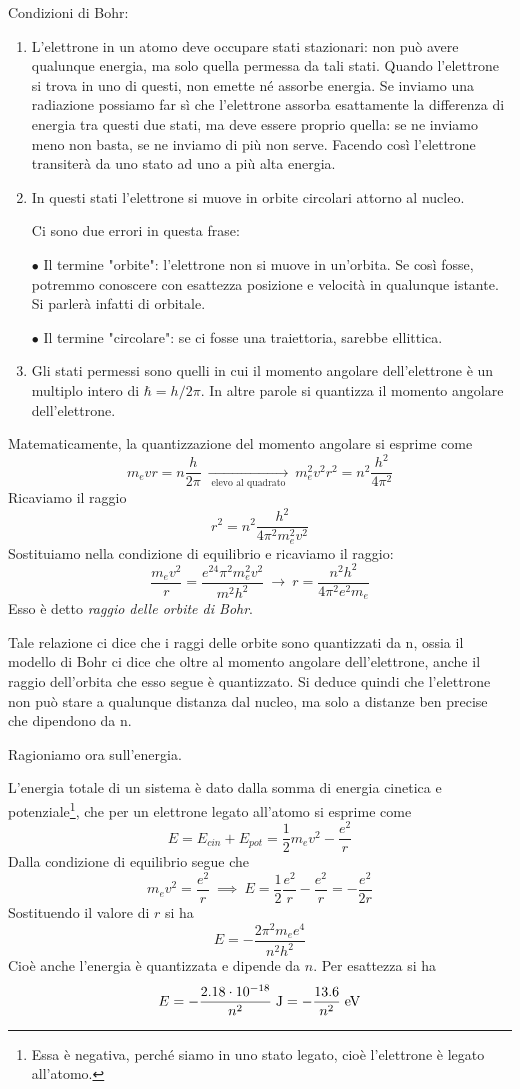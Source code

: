 Condizioni di Bohr:
\begin{enumerate}
  \item L'elettrone in un atomo deve occupare stati stazionari: non può avere qualunque energia, ma solo quella permessa da tali stati. Quando l'elettrone si trova in uno di questi, non emette né assorbe energia. Se inviamo una radiazione possiamo far sì che l'elettrone assorba esattamente la differenza di energia tra questi due stati, ma deve essere proprio quella: se ne inviamo meno non basta, se ne inviamo di più non serve.
  Facendo così l'elettrone transiterà da uno stato ad uno a più alta energia.
  \item In questi stati l'elettrone si muove in orbite circolari attorno al nucleo.
  
  Ci sono due errori in questa frase:

  $\bullet$ Il termine "orbite": l'elettrone non si muove in un'orbita. Se così fosse, potremmo conoscere con esattezza posizione e velocità in qualunque istante. Si parlerà infatti di orbitale.

  $\bullet$ Il termine "circolare": se ci fosse una traiettoria, sarebbe ellittica.
  \item Gli stati permessi sono quelli in cui il momento angolare dell'elettrone è un multiplo intero di $\hbar=h/2\pi$. In altre parole si quantizza il momento angolare dell'elettrone. 
\end{enumerate}
Matematicamente, la quantizzazione del momento angolare si esprime come
$$m_evr=n\frac{h}{2\pi}\ \xrightarrow[\; \text{elevo al quadrato} \;]{} \ m_e^2v^2r^2=n^2\frac{h^2}{4\pi^2}$$
Ricaviamo il raggio
$$r^2=n^2\frac{h^2}{4\pi^2m_e^2v^2}$$
Sostituiamo nella condizione di equilibrio e ricaviamo il raggio:
$$\frac{m_ev^2}{r}=\frac{e^24\pi^2m_e^2v^2}{m^2h^2}\ \rightarrow\ r=\frac{n^2h^2}{4\pi^2e^2m_e}$$
Esso è detto \textit{raggio delle orbite di Bohr}.

Tale relazione ci dice che i raggi delle orbite sono quantizzati da n, ossia il modello di Bohr ci dice che oltre al momento angolare dell'elettrone, anche il raggio dell'orbita che esso segue è quantizzato. Si deduce quindi che l'elettrone non può stare a qualunque distanza dal nucleo, ma solo a distanze ben precise che dipendono da n.

\vspace{0.2cm}Ragioniamo ora sull'energia.

L'energia totale di un sistema è dato dalla somma di energia cinetica e potenziale\footnote{Essa è negativa, perché siamo in uno stato legato, cioè l'elettrone è legato all'atomo.}, che per un elettrone legato all'atomo si esprime come
$$E=E_{cin} + E_{pot}=\frac{1}{2}m_ev^2 - \frac{e^2}{r}$$
Dalla condizione di equilibrio segue che
$$m_ev^2=\frac{e^2}{r}\ \implies\ E=\frac{1}{2}\frac{e^2}{r} - \frac{e^2}{r}=- \frac{e^2}{2r}$$
Sostituendo il valore di $r$ si ha
$$E=-\frac{2\pi^2m_ee^4}{n^2h^2}$$
Cioè anche l'energia è quantizzata e dipende da $n$. Per esattezza si ha
$$E=-\frac{2.18\cdot10^{-18}}{n^2} \; \text{J}
=-\frac{13.6}{n^2} \; \rm eV$$
